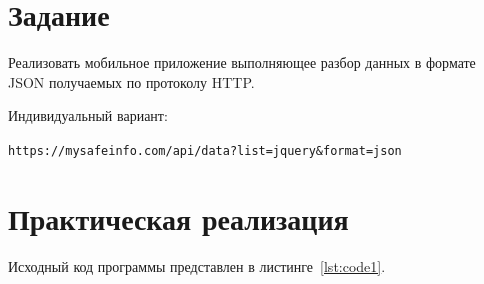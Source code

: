 \documentclass[a4paper, 14pt]{extarticle}
\begin{document}
\renewcommand{\ttdefault}{pcr}

\setlength{\tabcolsep}{3pt}
\newpage
\setcounter{page}{2}

\section{Задание}\label{Sect::task}

Реализовать мобильное приложение выполняющее разбор данных в формате JSON получаемых по протоколу HTTP.

Индивидуальный вариант:

\verb|https://mysafeinfo.com/api/data?list=jquery&format=json|

\section{Практическая реализация}\label{Sect::code}

Исходный код программы представлен в листинге~\ref{lst:code1}.
\end{document}
